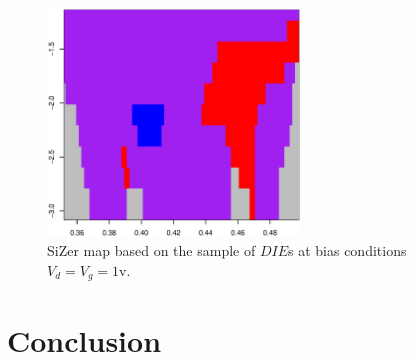 \documentclass[sn-mathphys]{sn-jnl}%
\theoremstyle{thmstyleone}%
\theoremstyle{thmstyletwo}%
\theoremstyle{thmstylethree}%
\begin{document}
\begin{figure}[ht]
	\centerline{\includegraphics [width=0.6\textwidth]{Fig16_sizerd1g1.eps}}%
	\caption{SiZer map based on the sample of $DIE$s at bias conditions $V_d=V_g=1$v.}
	\label{fig:sizer4}
\end{figure}

\section{Conclusion}\label{sec:concl}
\end{document}
